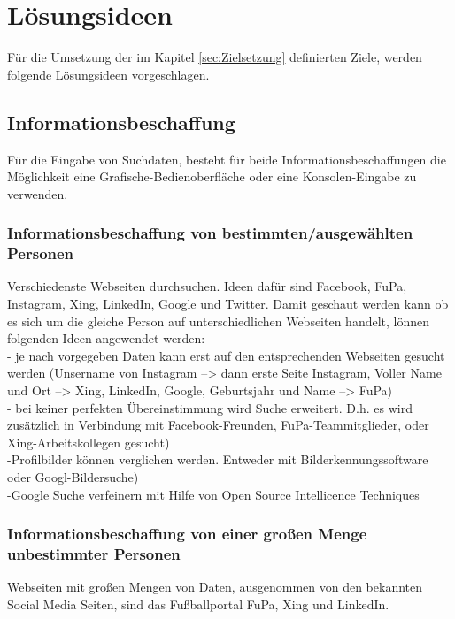 
\chapter{Lösungsideen}  %
\label{cha:Lösungsideen} %
Für die Umsetzung der im Kapitel \ref{sec:Zielsetzung} definierten Ziele, werden folgende Lösungsideen vorgeschlagen.

\section{Informationsbeschaffung} %
Für die Eingabe von Suchdaten, besteht für beide Informationsbeschaffungen die Möglichkeit eine Grafische-Bedienoberfläche oder eine Konsolen-Eingabe zu verwenden.
	\subsection{Informationsbeschaffung von bestimmten/ausgewählten Personen}
	Verschiedenste Webseiten durchsuchen. Ideen dafür sind Facebook, FuPa, Instagram, Xing, LinkedIn, Google und Twitter. Damit geschaut werden kann ob es sich um die gleiche Person auf unterschiedlichen Webseiten handelt, lönnen folgenden Ideen angewendet werden:\\
		- je nach vorgegeben Daten kann erst auf den entsprechenden Webseiten gesucht werden (Unsername von Instagram --> dann erste Seite Instagram, Voller Name und Ort --> Xing, LinkedIn, Google, Geburtsjahr und Name --> FuPa)\\
		- bei keiner perfekten Übereinstimmung wird Suche erweitert. D.h. es wird zusätzlich in Verbindung mit Facebook-Freunden, FuPa-Teammitglieder, oder Xing-Arbeitskollegen gesucht)\\
		-Profilbilder können verglichen werden. Entweder mit Bilderkennungssoftware oder Googl-Bildersuche)\\
		-Google Suche verfeinern mit Hilfe von Open Source Intellicence Techniques
		
	\subsection{Informationsbeschaffung von einer großen Menge unbestimmter Personen}
	Webseiten mit großen Mengen von Daten, ausgenommen von den bekannten Social Media Seiten, sind das Fußballportal FuPa, Xing und LinkedIn.
	
